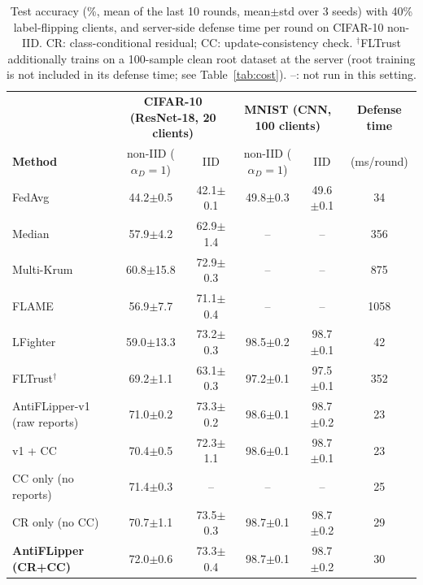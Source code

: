 \begin{table}[t]
\centering
\caption{Test accuracy (\%, mean of the last 10 rounds, mean$\pm$std over 3 seeds) with 40\% label-flipping clients, and server-side defense time per round on CIFAR-10 non-IID. CR: class-conditional residual; CC: update-consistency check. $^\dagger$FLTrust additionally trains on a 100-sample clean root dataset at the server (root training is not included in its defense time; see Table~\ref{tab:cost}). --: not run in this setting.}
\label{tab:headline}
\renewcommand{\arraystretch}{1.1}
\small
\begin{tabular}{l|cc|cc|c}
\hline
& \multicolumn{2}{c|}{\textbf{CIFAR-10 (ResNet-18, 20 clients)}} & \multicolumn{2}{c|}{\textbf{MNIST (CNN, 100 clients)}} & \textbf{Defense time} \\
\textbf{Method} & non-IID ($\alpha_D{=}1$) & IID & non-IID ($\alpha_D{=}1$) & IID & (ms/round) \\
\hline
FedAvg & 44.2$\pm$0.5 & 42.1$\pm$0.1 & 49.8$\pm$0.3 & 49.6$\pm$0.1 & 34 \\
Median & 57.9$\pm$4.2 & 62.9$\pm$1.4 & -- & -- & 356 \\
Multi-Krum & 60.8$\pm$15.8 & 72.9$\pm$0.3 & -- & -- & 875 \\
FLAME & 56.9$\pm$7.7 & 71.1$\pm$0.4 & -- & -- & 1058 \\
LFighter & 59.0$\pm$13.3 & 73.2$\pm$0.3 & 98.5$\pm$0.2 & 98.7$\pm$0.1 & 42 \\
FLTrust$^\dagger$ & 69.2$\pm$1.1 & 63.1$\pm$0.3 & 97.2$\pm$0.1 & 97.5$\pm$0.1 & 352 \\
\hline
AntiFLipper-v1 (raw reports) & 71.0$\pm$0.2 & 73.3$\pm$0.2 & 98.6$\pm$0.1 & 98.7$\pm$0.2 & 23 \\
\quad v1 + CC & 70.4$\pm$0.5 & 72.3$\pm$1.1 & 98.6$\pm$0.1 & 98.7$\pm$0.1 & 23 \\
\quad CC only (no reports) & 71.4$\pm$0.3 & -- & -- & -- & 25 \\
\quad CR only (no CC) & 70.7$\pm$1.1 & 73.5$\pm$0.3 & 98.7$\pm$0.1 & 98.7$\pm$0.2 & 29 \\
\hline
\textbf{AntiFLipper (CR+CC)} & 72.0$\pm$0.6 & 73.3$\pm$0.4 & 98.7$\pm$0.1 & 98.7$\pm$0.2 & 30 \\
\hline
\end{tabular}
\end{table}
